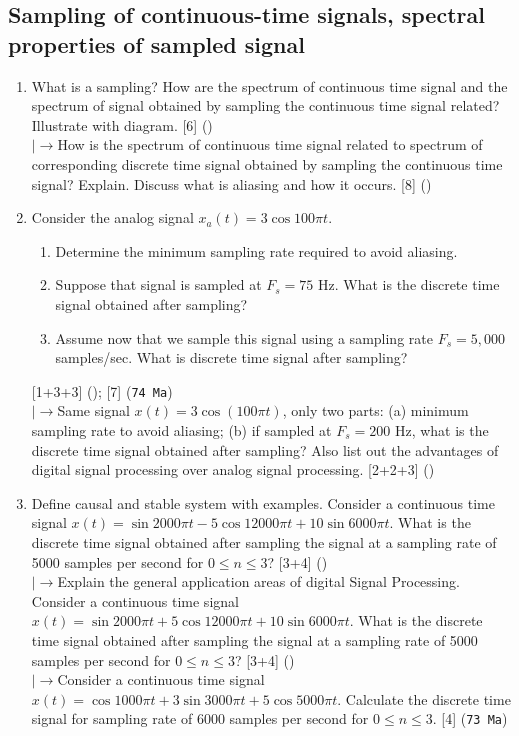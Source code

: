 \documentclass[12pt]{article}
\newcommand{\lb}{\\$\left|\rightarrow\right.$}
\begin{document}
  \subsection{Sampling of continuous-time signals, spectral properties of sampled signal}
    \begin{enumerate}[topsep=0pt, noitemsep]
      \item What is a sampling? How are the spectrum of continuous time signal and the spectrum of signal obtained by sampling the continuous time signal related? Illustrate with diagram. \hfill [6] ()
        \lb How is the spectrum of continuous time signal related to spectrum of corresponding discrete time signal obtained by sampling the continuous time signal? Explain. Discuss what is aliasing and how it occurs. \hfill [8] ()

      \item Consider the analog signal $x_a(t)=3\cos 100\pi t$.
        \begin{enumerate}[label=(\alph*), noitemsep, topsep=0pt]
          \item Determine the minimum sampling rate required to avoid aliasing.
          \item Suppose that signal is sampled at $F_s=75$ Hz. What is the discrete time signal obtained after sampling?
          \item Assume now that we sample this signal using a sampling rate $F_s=5{,}000$ samples/sec. What is discrete time signal after sampling?
        \end{enumerate}
        \hfill [1+3+3] (); [7] (\texttt{74 Ma})
        \lb Same signal $x(t)=3\cos(100\pi t)$, only two parts: (a) minimum sampling rate to avoid aliasing; (b) if sampled at $F_s=200$ Hz, what is the discrete time signal obtained after sampling? Also list out the advantages of digital signal processing over analog signal processing. \hfill [2+2+3] ()

      \item Define causal and stable system with examples. Consider a continuous time signal $x(t)=\sin 2000\pi t-5\cos 12000\pi t+10\sin 6000\pi t$. What is the discrete time signal obtained after sampling the signal at a sampling rate of 5000 samples per second for $0\le n\le 3$? \hfill [3+4] ()
        \lb Explain the general application areas of digital Signal Processing. Consider a continuous time signal $x(t)=\sin 2000\pi t+5\cos 12000\pi t+10\sin 6000\pi t$. What is the discrete time signal obtained after sampling the signal at a sampling rate of 5000 samples per second for $0\le n\le 3$? \hfill [3+4] ()
        \lb Consider a continuous time signal $x(t)=\cos 1000\pi t+3\sin 3000\pi t+5\cos 5000\pi t$. Calculate the discrete time signal for sampling rate of 6000 samples per second for $0\le n\le 3$. \hfill [4] (\texttt{73 Ma})


\end{enumerate}
\end{document}
